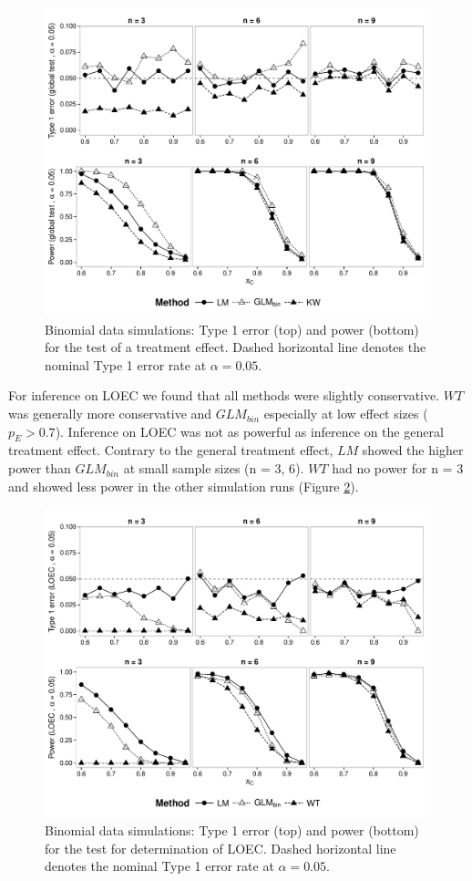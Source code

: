 \documentclass[twocolumn, natbib]{svjour3}
\begin{document}
\begin{figure}
  \centering
  \includegraphics[width = 126mm]{p_glob_p.pdf}
  \caption{
  Binomial data simulations: 
  Type 1 error (top) and  power (bottom) for the test of a treatment effect. 
  Dashed horizontal line denotes the nominal Type 1 error rate at $\alpha = 0.05$.
  }
  \label{fig:p_glob_p}
\end{figure}

For inference on LOEC we found that all methods were slightly conservative.
$WT$ was generally more conservative and $GLM_{bin}$ especially at low effect sizes ($p_E > 0.7$).
Inference on LOEC was not as powerful as inference on the general treatment effect.
Contrary to the general treatment effect, $LM$ showed the higher power than $GLM_{bin}$ at small sample sizes (n = {3, 6}).
$WT$ had no power for n = 3 and showed less power in the other simulation runs (Figure \ref{fig:p_loec_p}).

\begin{figure}
  \centering
  \includegraphics[width = 126mm]{p_loec_p.pdf}
  \caption{
  Binomial data simulations: 
  Type 1 error (top) and power (bottom) for the test for determination of LOEC. 
  Dashed horizontal line denotes the nominal Type 1 error rate at $\alpha = 0.05$.
  }
  \label{fig:p_loec_p}
\end{figure}
\end{document}
